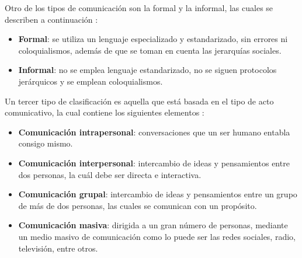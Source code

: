 Otro de los tipos de comunicación son la formal y la informal, las cuales se describen a continuación \cite{ref23}:

\begin{itemize}
    \item \textbf{Formal}: se utiliza un lenguaje especializado y estandarizado, sin errores ni coloquialismos, además de que se toman en cuenta las jerarquías sociales.
    \item \textbf{Informal}: no se emplea lenguaje estandarizado, no se siguen protocolos jerárquicos y se emplean coloquialismos.
\end{itemize}

Un tercer tipo de clasificación es aquella que está basada en el tipo de acto comunicativo, la cual contiene los siguientes elementos \cite{ref23}:
\begin{itemize}
    \item \textbf{Comunicación intrapersonal}: conversaciones que un ser humano entabla consigo mismo.
    \item \textbf{Comunicación interpersonal}: intercambio de ideas y pensamientos entre dos personas, la cuál debe ser directa e interactiva.
    \item \textbf{Comunicación grupal}: intercambio de ideas y pensamientos entre un grupo de más de dos personas, las cuales se comunican con un propósito.
    \item \textbf{Comunicación masiva}: dirigida a un gran número de personas, mediante un medio masivo de comunicación como lo puede ser las redes sociales, radio, televisión, entre otros.
\end{itemize}

